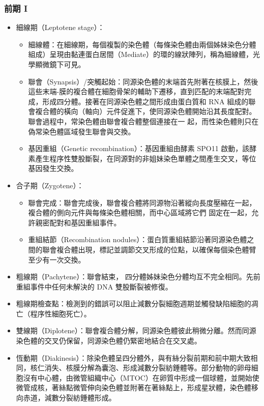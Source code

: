 \documentclass[a4paper,12pt]{report}
\begin{document}
\subsubsection{前期 I }
\begin{itemize}
  \item 細線期（Leptotene stage）：
  \begin{itemize}
    \item 細線體：在細線期，每個複製的染色體（每條染色體由兩個姊妹染色分體組成）呈現由黏連蛋白居間（Mediate）的環的線狀陣列，稱為細線體，光學顯微鏡下可見。
    \item 聯會（Synapsis）/突觸起始：同源染色體的末端首先附著在核膜上，然後這些末端-膜的複合體在細胞骨架的輔助下遷移，直到匹配的末端配對完成，形成四分體。接著在同源染色體之間形成由蛋白質和 RNA 組成的聯會複合體的橫向（軸向）元件促進下，使同源染色體開始沿其長度配對。聯會過程中，常染色體由聯會複合體整個連接在一 起，而性染色體則只在偽常染色體區域發生聯會與交換。
    \item 基因重組（Genetic recombination）：基因重組由酵素 SPO11 啟動，該酵素產生程序性雙股斷裂，在同源對的非姐妹染色單體之間產生交叉，等位基因發生交換。
\end{itemize}
  \item 合子期（Zygotene）：
  \begin{itemize}
    \item 聯會完成：聯會完成後，聯會複合體將同源物沿著縱向長度壓縮在一起，複合體的側向元件與每條染色體相關，而中心區域將它們 固定在一起，允許親密配對和基因重組事件。
    \item 重組結節（Recombination nodules）：蛋白質重組結節沿著同源染色體之間的聯會複合體出現，標記並調節交叉形成的位點，以確保每個染色體臂至少有一次交換。
\end{itemize}
  \item 粗線期（Pachytene）：聯會結束， 四分體姊妹染色分體均互不完全相同。先前重組事件中任何未解決的 DNA 雙股斷裂被修復。
  \item 粗線期檢查點：檢測到的錯誤可以阻止減數分裂細胞週期並觸發缺陷細胞的凋亡（程序性細胞死亡）。
  \item 雙線期（Diplotene）：聯會複合體分解，同源染色體彼此稍微分離。然而同源染色體的交叉仍保留，同源染色體仍緊密地結合在交叉處。
  \item 恆動期（Diakinesis）：除染色體呈四分體外，與有絲分裂前期和前中期大致相同，核仁消失、核膜分解為囊泡、形成減數分裂紡錘體等。部分動物的卵母細胞沒有中心體，由微管組織中心（MTOC）在卵質中形成一個球體，並開始使微管成核，著絲點微管伸向染色體並附著在著絲點上，形成星狀體，染色體移向赤道，減數分裂紡錘體形成。
\end{itemize}
\end{document}
